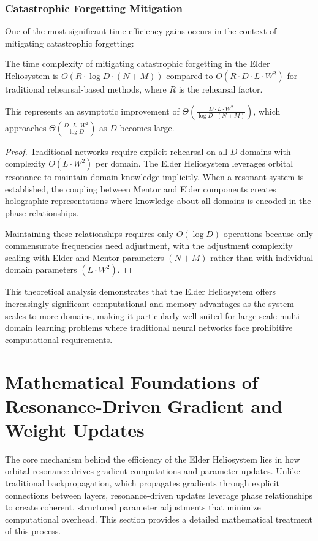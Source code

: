 \subsubsection{Catastrophic Forgetting Mitigation}

One of the most significant time efficiency gains occurs in the context of mitigating catastrophic forgetting:

\begin{theorem}
The time complexity of mitigating catastrophic forgetting in the Elder Heliosystem is $O(R \cdot \log D \cdot (N + M))$ compared to $O(R \cdot D \cdot L \cdot W^2)$ for traditional rehearsal-based methods, where $R$ is the rehearsal factor.

This represents an asymptotic improvement of $\Theta(\frac{D \cdot L \cdot W^2}{\log D \cdot (N + M)})$, which approaches $\Theta(\frac{D \cdot L \cdot W^2}{\log D})$ as $D$ becomes large.
\end{theorem}

\begin{proof}
Traditional networks require explicit rehearsal on all $D$ domains with complexity $O(L \cdot W^2)$ per domain. The Elder Heliosystem leverages orbital resonance to maintain domain knowledge implicitly. When a resonant system is established, the coupling between Mentor and Elder components creates holographic representations where knowledge about all domains is encoded in the phase relationships. 

Maintaining these relationships requires only $O(\log D)$ operations because only commensurate frequencies need adjustment, with the adjustment complexity scaling with Elder and Mentor parameters $(N + M)$ rather than with individual domain parameters $(L \cdot W^2)$.
\end{proof}

This theoretical analysis demonstrates that the Elder Heliosystem offers increasingly significant computational and memory advantages as the system scales to more domains, making it particularly well-suited for large-scale multi-domain learning problems where traditional neural networks face prohibitive computational requirements.

\section{Mathematical Foundations of Resonance-Driven Gradient and Weight Updates}

The core mechanism behind the efficiency of the Elder Heliosystem lies in how orbital resonance drives gradient computations and parameter updates. Unlike traditional backpropagation, which propagates gradients through explicit connections between layers, resonance-driven updates leverage phase relationships to create coherent, structured parameter adjustments that minimize computational overhead. This section provides a detailed mathematical treatment of this process.

